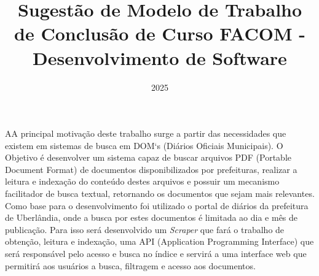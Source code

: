 \documentclass{facomdsw}
\title{Sugestão de Modelo de Trabalho de Conclusão de Curso FACOM - Desenvolvimento de Software}
\date{2025}
\begin{document}
	
	\pretextual
	
	\maketitle

	
	
	
	
	\begin{resumo}
		AA principal motivação deste trabalho surge a partir das necessidades que existem em sistemas de busca em DOM`s (Diários Oficiais Municipais). O Objetivo é desenvolver um sistema capaz de buscar arquivos PDF (Portable Document Format) de documentos disponibilizados por prefeituras, realizar a leitura e indexação do conteúdo destes arquivos e possuir um mecanismo facilitador de busca textual, retornando os documentos que sejam mais relevantes. Como base para o desenvolvimento foi utilizado o portal de diários da prefeitura de Uberlândia, onde a busca por estes documentos é limitada ao dia e mês de publicação. Para isso será desenvolvido um \textit{Scraper} que fará o trabalho de obtenção, leitura e indexação, uma API (Application Programming Interface) que será responsável pelo acesso e busca no índice e servirá a uma interface web que permitirá aos usuários a busca, filtragem e acesso aos documentos.
		
        \end{resumo}
	\listailustracoes
	
\end{document}
